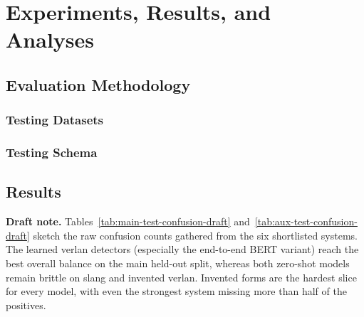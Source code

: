 \documentclass[12pt]{article}
\begin{document}
\section{Experiments, Results, and Analyses}

\subsection{Evaluation Methodology}
\subsubsection{Testing Datasets}
\subsubsection{Testing Schema}

\subsection{Results}
\textbf{Draft note.} Tables~\ref{tab:main-test-confusion-draft} and~\ref{tab:aux-test-confusion-draft} sketch the raw confusion counts gathered from the six shortlisted systems.  The learned verlan detectors (especially the end-to-end BERT variant) reach the best overall balance on the main held-out split, whereas both zero-shot models remain brittle on slang and invented verlan.  Invented forms are the hardest slice for every model, with even the strongest system missing more than half of the positives.
\end{document}
